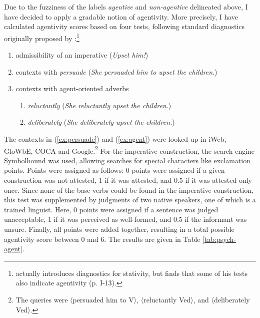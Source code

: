 Due to the fuzziness of the labels \textit{agentive} and \textit{non-agentive} delineated above, I have decided to apply a gradable notion of agentivity. 
More precisely, I have calculated agentivity scores based on four tests, following standard diagnostics originally proposed by \citet{Lakoff.1966}:\footnote{\citet{Lakoff.1966} actually introduces diagnostics for stativity, but finds that some of his tests also indicate agentivity (p. $\mathrm{I}$-13).} 

\begin{enumerate}
\item admissibility of an imperative (\textit{Upset him!})
\item \label{ex:persuade} contexts with \textit{persuade} (\textit{She persuaded him to upset the children}.)
\item \label{ex:agent} contexts with agent-oriented adverbs 
\begin{enumerate}
\item \textit{reluctantly} (\textit{She reluctantly upset the children}.)
\item \textit{deliberately} (\textit{She deliberately upset the children.})
\end{enumerate}
\end{enumerate}

\noindent The contexts in (\ref{ex:persuade}) and (\ref{ex:agent}) were looked up in \acs{iWeb}, \acs{GloWbE}, \acs{COCA} and Google.\footnote{The queries were 〈persuaded him to V〉, 〈reluctantly Ved〉, and 〈deliberately Ved〉.} For the imperative construction, the search engine Symbolhound was used, allowing searches for special characters like exclamation points.  
Points were assigned as follows: 0 points were assigned if a given construction was not attested, 1 if it was attested, and 0.5 if it was attested only once. 
Since none of the base verbs could be found in the imperative construction, this test was supplemented by judgments of two native speakers, one of which is a trained linguist.
Here, 0 points were assigned if a sentence was judged unacceptable, 1 if it was perceived as well-formed, and 0.5 if the informant was unsure. 
Finally, all points were added together, resulting in a total possible agentivity score between 0 and 6. The results are given in Table \ref{tab:psych-agent}.

